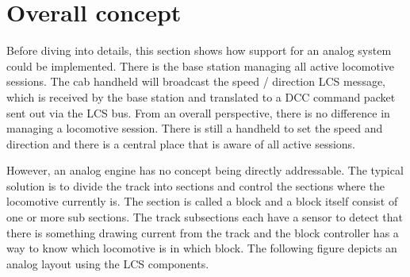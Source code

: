 \section{Overall concept}

Before diving into details, this section shows how support for an analog system could be implemented. There is the base station managing all active locomotive sessions. The cab handheld will broadcast the speed / direction LCS message, which is received by the base station and translated to a DCC command packet sent out via the LCS bus. From an overall perspective, there is no difference in managing a locomotive session. There is still a handheld to set the speed and direction and there is a central place that is aware of all active sessions.

However, an analog engine has no concept being directly addressable. The typical solution is to divide the track into sections and control the sections where the locomotive currently is. The section is called a block and a block itself consist of one or more sub sections. The track subsections each have a sensor to detect that there is something drawing current from the track and the block controller has a way to know which locomotive is in which block. The following figure depicts an analog layout using the LCS components.

